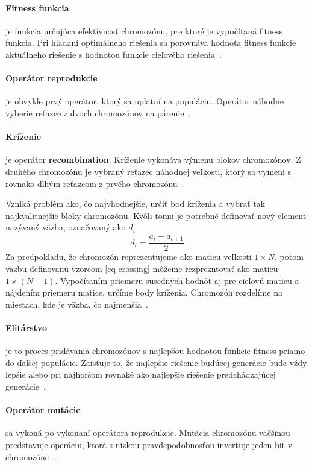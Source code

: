 \documentclass[a4paper,slovak,12pt,appendix]{article}
\begin{document}
\paragraph{Fitness funkcia} je funkcia určujúca efektívnosť chromozónu, pre
ktoré je vypočítaná fitness funkcia. Pri hľadaní optimálneho riešenia sa
porovnáva hodnota fitness funkcie aktuálneho riešenie s hodnotou funkcie
cieľového riešenia~\cite{Chavan2015, Simonova2007}.

\paragraph{Operátor reprodukcie} je obvykle prvý operátor, ktorý sa uplatní na
populáciu. Operátor náhodne vyberie reťazce z dvoch chromozónov na
párenie~\cite{Chavan2015}.

\paragraph{Kríženie} je operátor \textbf{recombination}. Kríženie vykonáva
výmenu blokov chromozónov. Z druhého chromozónu je vybraný reťazec náhodnej
veľkosti, ktorý sa vymení s rovnako dlhým reťazcom z prvého
chromozónu~\cite{Chavan2015}.

Vzniká problém ako, čo najvhodnejšie, určiť bod kríženia a vybrať tak
najkvalitnejšie bloky chromozónu. Kvôli tomu je potrebné definovať nový element
nazývaný väzba, označovaný ako $d_i$
\begin{equation}
  d_i = \frac{a_i + a_{i+1}}{2}
  \label{eq-crossing}
\end{equation}
Za predpokladu, že chromozón reprezentujeme ako maticu veľkosti $1 \times N$,
potom väzbu definovanú vzorcom \ref{eq-crossing} môžeme rezprezntovať ako
maticu $1 \times (N-1)$. Vypočítaním priemeru susedných hodnôt aj pre cieľovú
maticu a nájdením priemeru matice, určíme body kríženia. Chromozón rozdelíme na
miestach, kde je väzba, čo najmenšia~\cite{Simonova2007}.

\paragraph{Elitárstvo} je to proces pridávania chromozónov s najlepšou hodnotou
funkcie fitness priamo do ďalšej populácie. Zaisťuje to, že najlepšie riešenie
budúcej generácie bude vždy lepšie alebo pri najhoršom rovnaké ako najlepšie
riešenie predchádzajúcej generácie~\cite{Deolekar2016}.

\paragraph{Operátor mutácie} sa vykoná po vykonaní operátora reprodukcie.
Mutácia chromozónu väčšinou predstavuje operáciu, ktorá s nízkou
pravdepodobnosťou invertuje jeden bit v chromozóne~\cite{Chavan2015}.
\end{document}
